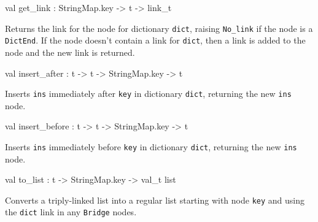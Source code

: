 \documentclass[11pt]{article}
\begin{document}
\label{val:Key.get-underscorelink}\begin{ocamldoccode}
val get_link : StringMap.key -> t -> link_t
\end{ocamldoccode}
\begin{ocamldocdescription}
Returns the link for the node for dictionary {\tt{dict}}, raising {\tt{No\_link}}
    if the node is a {\tt{DictEnd}}. If the node doesn't contain a link for
    {\tt{dict}}, then a link is added to the node and the new link is returned.


\end{ocamldocdescription}




\label{val:Key.insert-underscoreafter}\begin{ocamldoccode}
val insert_after : t -> t -> StringMap.key -> t
\end{ocamldoccode}
\begin{ocamldocdescription}
Inserts {\tt{ins}} immediately after {\tt{key}} in dictionary {\tt{dict}}, 
    returning the new {\tt{ins}} node.


\end{ocamldocdescription}




\label{val:Key.insert-underscorebefore}\begin{ocamldoccode}
val insert_before : t -> t -> StringMap.key -> t
\end{ocamldoccode}
\begin{ocamldocdescription}
Inserts {\tt{ins}} immediately before {\tt{key}} in dictionary {\tt{dict}}, 
    returning the new {\tt{ins}} node.


\end{ocamldocdescription}




\label{val:Key.to-underscorelist}\begin{ocamldoccode}
val to_list : t -> StringMap.key -> val_t list
\end{ocamldoccode}
\begin{ocamldocdescription}
Converts a triply-linked list into a regular list starting with node
    {\tt{key}} and using the {\tt{dict}} link in any {\tt{Bridge}} nodes.


\end{ocamldocdescription}
\end{document}
